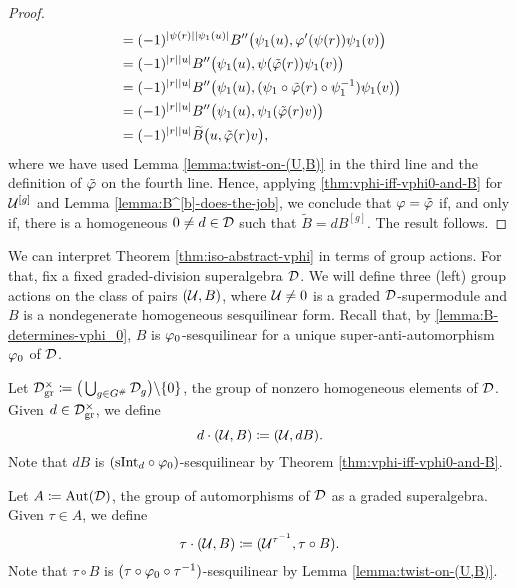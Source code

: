 \begin{proof}
\begin{align*}
		                    & = (-1)^{|\psi(r)||\psi_1(u)|} B'' \big( \psi_1(u), \varphi'( \psi(r) ) \psi_1(v) \big)                \\
		                    & = (-1)^{|r||u|} B'' \big( \psi_1(u), \psi (\tilde{\varphi}(r)) \psi_1(v) \big)                          \\
		                    & = (-1)^{|r||u|} B'' \big( \psi_1(u), (\psi_1 \circ \tilde{\varphi}(r) \circ \psi_1^{-1}) \psi_1(v) \big) \\
		                    & = (-1)^{|r||u|} B'' \big( \psi_1(u), \psi_1 (\tilde{\varphi}(r) v) \big)                                \\
		                    & = (-1)^{|r||u|} \widetilde B \big( u, \tilde{\varphi}(r) v\big),
	\end{align*}
	where we have used Lemma \ref{lemma:twist-on-(U,B)} in the third line and the definition of $\tilde {\varphi}$ on the fourth line.
	Hence, applying \cref{thm:vphi-iff-vphi0-and-B} for $\mathcal U^{[g]}$ and Lemma \ref{lemma:B^[b]-does-the-job}, we conclude that $\varphi = \tilde{\varphi}$ if, and only if, there is a homogeneous $0 \neq d \in \mathcal{D}$ such that $\widetilde B = dB^{[g]}$.
	The result follows.
\end{proof}

We can interpret Theorem \ref{thm:iso-abstract-vphi} in terms of group actions.
For that, fix a fixed graded-division superalgebra $\mathcal{D}$.
We will define three (left) group actions on the class of pairs $(\mathcal U, B)$, where $\mathcal U \neq 0$ is a graded $\mathcal{D}$-supermodule and $B$ is a nondegenerate homogeneous sesquilinear form.
Recall that, by \cref{lemma:B-determines-vphi_0}, $B$ is $\varphi_0$-sesquilinear for a unique super-anti-automorphism $\varphi_0$ of $\mathcal{D}$.

Let $\D^\times_{\mathrm{gr}} \coloneqq \big( \bigcup_{g \in G^\#} \D_g \big)\backslash \{ 0 \}$, the group of nonzero homogeneous elements of $\mathcal{D}$.
Given $d\in \mathcal{D}^\times_{\mathrm{gr}}$, we define
\begin{equation}\label{eq:Dx_gr-action}
	d\cdot (\mathcal U, B) \coloneqq (\mathcal U, dB).
\end{equation}
Note that $dB$ is $(\mathrm{sInt}_d \circ \varphi_0)$-sesquilinear by Theorem \ref{thm:vphi-iff-vphi0-and-B}.

Let $A \coloneqq \operatorname{Aut} (\mathcal{D})$, the group of automorphisms of $\mathcal{D}$ as a graded superalgebra.
Given $\tau \in A$, we define
\begin{equation}\label{eq:Aut(D)-action}
	\tau \cdot (\mathcal U, B) \coloneqq (\mathcal U^{\tau^{-1}}, \tau \circ B).
\end{equation}
Note that $\tau \circ B$ is $(\tau \circ \varphi_0 \circ \tau^{-1})$-sesquilinear by Lemma \ref{lemma:twist-on-(U,B)}.

